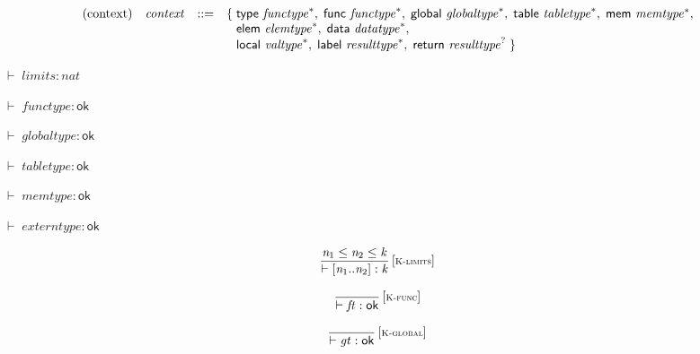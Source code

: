 $$
\begin{array}{@{}lrrl@{}l@{}}
\mbox{(context)} & {\mathit{context}} &::=& \{\; \begin{array}[t]{@{}l@{}l@{}}
\mathsf{type}~{{\mathit{functype}}^\ast},\; \mathsf{func}~{{\mathit{functype}}^\ast},\; \mathsf{global}~{{\mathit{globaltype}}^\ast},\; \mathsf{table}~{{\mathit{tabletype}}^\ast},\; \mathsf{mem}~{{\mathit{memtype}}^\ast},\; \\
  \mathsf{elem}~{{\mathit{elemtype}}^\ast},\; \mathsf{data}~{{\mathit{datatype}}^\ast},\; \\
  \mathsf{local}~{{\mathit{valtype}}^\ast},\; \mathsf{label}~{{\mathit{resulttype}}^\ast},\; \mathsf{return}~{{\mathit{resulttype}}^?} \;\}\end{array} \\
\end{array}
$$

\vspace{1ex}

$\boxed{{ \vdash }\;{\mathit{limits}} : {\mathit{nat}}}$

$\boxed{{ \vdash }\;{\mathit{functype}} : \mathsf{ok}}$

$\boxed{{ \vdash }\;{\mathit{globaltype}} : \mathsf{ok}}$

$\boxed{{ \vdash }\;{\mathit{tabletype}} : \mathsf{ok}}$

$\boxed{{ \vdash }\;{\mathit{memtype}} : \mathsf{ok}}$

$\boxed{{ \vdash }\;{\mathit{externtype}} : \mathsf{ok}}$

\vspace{1ex}

$$
\begin{array}{@{}c@{}}\displaystyle
\frac{
{\mathit{n}}_{{1}} \leq {\mathit{n}}_{{2}} \leq {\mathit{k}}
}{
{ \vdash }\;{}[{\mathit{n}}_{{1}} .. {\mathit{n}}_{{2}}] : {\mathit{k}}
} \, {[\textsc{\scriptsize K{-}limits}]}
\qquad
\end{array}
$$

$$
\begin{array}{@{}c@{}}\displaystyle
\frac{
}{
{ \vdash }\;{\mathit{ft}} : \mathsf{ok}
} \, {[\textsc{\scriptsize K{-}func}]}
\qquad
\end{array}
$$

$$
\begin{array}{@{}c@{}}\displaystyle
\frac{
}{
{ \vdash }\;{\mathit{gt}} : \mathsf{ok}
} \, {[\textsc{\scriptsize K{-}global}]}
\qquad
\end{array}
$$

